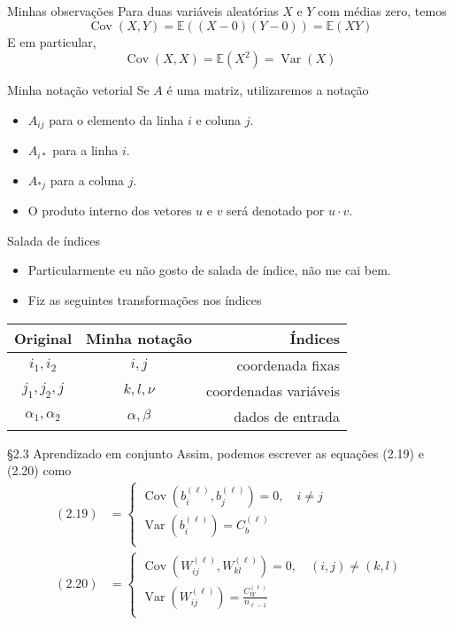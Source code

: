 \documentclass{beamer}
\newcommand{\EE}{\mathbb{E}}
\DeclareMathOperator{\Cov}{Cov}
\DeclareMathOperator{\Var}{Var}
\newcommand{\aaA}{\alpha}
\newcommand{\aaB}{\beta}
\begin{document}
\begin{frame}{Minhas observações}
	Para duas variáveis aleatórias $X$ e $Y$ com médias zero, temos 
	$$\Cov(X,Y) = \EE((X-0)(Y-0)) = \EE(XY)$$
	E em particular, 
	$$\Cov(X,X) = \EE(X^2) = \Var(X)$$
\end{frame}

\begin{frame}{Minha notação vetorial}
	Se $A$ é uma matriz, utilizaremos a notação 
	\begin{itemize}
		\item $A_{ij}$ para o elemento da linha $i$ e coluna $j$.
		\item $A_{i*}$ para a linha $i$.	
		\item $A_{*j}$ para a coluna $j$.
		\item O produto interno dos vetores $u$ e $v$ será denotado por $u\cdot v$.
	\end{itemize}
\end{frame}

\begin{frame}{Salada de índices}
	\begin{itemize}
		\item Particularmente eu não gosto de salada de índice, não me cai bem. 
		\item Fiz as seguintes transformações nos índices
		
	\end{itemize}
	\begin{center}
		\begin{tabular}{c c r}
			\hline
			\textbf{Original}  &\textbf{Minha notação} & \textbf{Índices}\\
			\hline
			 $i_1, i_2$ & $i, j$ &  coordenada fixas \\ 
			 $j_1, j_2, j$ & $k, l, \nu$ &  coordenadas variáveis \\		
			 $\alpha_1, \alpha_2$  & $\aaA, \aaB$ & dados de entrada \\
		\end{tabular}		
	\end{center}
	
\end{frame}

\begin{frame}{\S 2.3 Aprendizado em conjunto}	
	Assim, podemos escrever as equações (2.19) e (2.20) como
	\begin{align*}
		(2.19) &= \begin{cases}
		\Cov\left(b^{(\ell)}_{i},b^{(\ell)}_j\right) = 0, \quad i\neq j\\[1ex]
		\Var\left(b^{(\ell)}_{i}\right) = C_b^{(\ell)} \\
		\end{cases}  \tag{2.19'}\\[2ex] 
		(2.20) &= \begin{cases}
		\Cov\left(W^{(\ell)}_{ij},W^{(\ell)}_{kl}\right) = 0, \quad (i,j)\neq (k,l)\\[1ex]
		\Var\left(W^{(\ell)}_{ij}\right) = \frac{C_W^{(\ell)}}{n_{\ell-1}} \\
		\end{cases} \tag{2.20'}
	\end{align*}
\end{frame}
\end{document}
